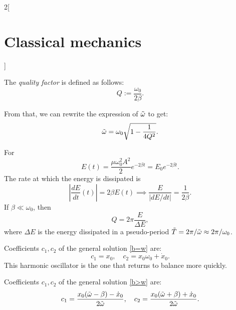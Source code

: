 \documentclass[../../../main.tex]{subfiles}
\begin{document}
\begin{multicols}{2}[\section{Classical mechanics}]
\begin{definition}
    The \textit{quality factor} is defined as follows: $$Q:=\frac{\omega_0}{2\beta}.$$
\end{definition}
\noindent From that, we can rewrite the expression of $\Tilde{\omega}$ to get: $$\Tilde{\omega}=\omega_0\sqrt{1-\frac{1}{4Q^2}}.$$
\begin{concept}
    For 
    $$E(t)=\frac{\mu\omega_0^2A^2}{2}e^{-2\beta t}=E_0e^{-2\beta t}.$$ The rate at which the energy is dissipated is $$\left|\frac{dE}{dt}(t)\right|=2\beta E(t)\implies\frac{E}{\left|dE/dt\right|}=\frac{1}{2\beta}.$$
    If $\beta\ll\omega_0$, then $$Q=2\pi\frac{E}{\Delta E},$$ where $\Delta E$ is the energy dissipated in a pseudo-period $\Tilde{T}=2\pi/\Tilde{\omega}\approx2\pi/\omega_0$.
\end{concept}
\begin{concept}[Critically damped harmonic oscillator: $\beta=\omega_0$]
    Coefficients $c_1,c_2$ of the general solution \eqref{b=w} are: $$c_1=x_0,\quad c_2=x_0\omega_0+\dot{x}_0.$$ This harmonic oscillator is the one that returns to balance more quickly.
\end{concept}
\begin{concept}
    Coefficients $c_1,c_2$ of the general solution \eqref{b>w} are: $$c_1=\frac{x_0(\Tilde{\omega}-\beta)-\dot{x}_0}{2\Tilde{\omega}},\quad c_2=\frac{x_0(\Tilde{\omega}+\beta)+\dot{x}_0}{2\Tilde{\omega}}.$$
\end{concept}

\end{multicols}
\end{document}
